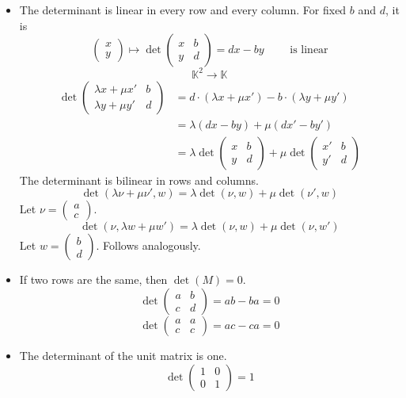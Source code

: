 \documentclass{article}
\newcommand{\vectwo}[2]{\begin{pmatrix} #1 \\ #2 \end{pmatrix}}
\begin{document}
\begin{itemize}
  \item The determinant is linear in every row and every column.
    For fixed $b$ and $d$, it is
    \[ \vectwo xy \mapsto \det{\begin{pmatrix} x & b \\ y & d \end{pmatrix}} = dx - by \qquad \text{ is linear} \]
    \[ \mathbb K^2 \to \mathbb K \]
    \begin{align*}
      \det{\begin{pmatrix} \lambda x + \mu x' & b \\ \lambda y + \mu y' & d \end{pmatrix}}
        &= d \cdot (\lambda x + \mu x') - b \cdot (\lambda y + \mu y') \\
        &= \lambda (dx - by) + \mu (dx' - by') \\
        &= \lambda \det{\begin{pmatrix} x & b \\ y & d \end{pmatrix}} + \mu \det{\begin{pmatrix} x' & b \\  y' & d \end{pmatrix}}
    \end{align*}
    The determinant is bilinear in rows and columns.
    \[ \det(\lambda \nu + \mu \nu', w) = \lambda \det(\nu, w) + \mu \det(\nu', w) \]
    Let $\nu = \vectwo{a}{c}$.
    \[ \det(\nu, \lambda w + \mu w') = \lambda \det(\nu, w) + \mu \det(\nu, w') \]
    Let $w = \vectwo bd$.
    Follows analogously.
  \item If two rows are the same, then $\det(M) = 0$.
    \[ \det\begin{pmatrix} a & b \\ c & d \end{pmatrix} = ab - ba = 0 \]
    \[ \det\begin{pmatrix} a & a \\ c & c \end{pmatrix} = ac - ca = 0 \]
  \item The determinant of the unit matrix is one.
    \[ \det\begin{pmatrix} 1 & 0 \\ 0 & 1 \end{pmatrix} = 1 \]
\end{itemize}
\end{document}
